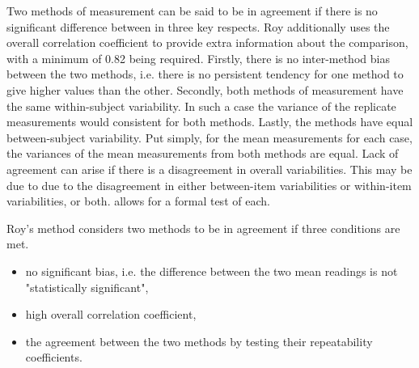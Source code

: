 \documentclass[12pt, a4paper]{report}
\theoremstyle{plain}
\theoremstyle{definition}
\theoremstyle{remark}
\begin{document}
	
	
	Two methods of measurement can be said to be in agreement if there is no significant difference between in three key respects. 
	Roy additionally uses the overall correlation coefficient to provide extra information about the comparison, with a minimum of 0.82 being required. Firstly, there is no inter-method bias between the two methods, i.e. there is no persistent tendency for one method to give higher values than the other. Secondly, both methods of measurement have the same  within-subject variability. In such a case the variance of the replicate measurements would consistent for both methods. Lastly, the methods have equal between-subject variability.  Put simply, for the mean measurements for each case, the variances of the mean measurements from both methods are equal. Lack of agreement can arise if there is a disagreement in overall variabilities. This may be due to due to the disagreement in either between-item variabilities or within-item variabilities, or both. \citet{ARoy2009} allows for a formal test of each.
	
	Roy's method considers two methods to be in agreement if three
	conditions are met.
	
	\begin{itemize}
		\item no significant bias, i.e. the difference between the two
		mean readings is not "statistically significant",
		
		\item high overall correlation coefficient,
		
		\item the agreement between the two methods by testing their
		repeatability coefficients.
		
	\end{itemize}
	
	
	
\end{document}

